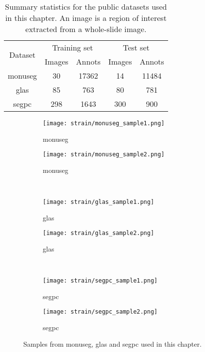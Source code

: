 \begin{table}
  \centering
  \begin{tabular}{|c|cc|cc|}
    \hline
    \multirow{2}{*}{Dataset} & \multicolumn{2}{c|}{Training set} & \multicolumn{2}{c|}{Test set}\\
    & Images & Annots    & Images & Annots  \\
    \hline
    \acrshort{monuseg} & 30 & 17362 & 14 & 11484\\
    \acrshort{glas} & 85 & 763 & 80 & 781 \\
    \acrshort{segpc} & 298 & 1643 & 300 & 900 \\
    \hline
  \end{tabular}
  \caption{Summary statistics for the public datasets used in this chapter. An image is a region of interest extracted from a whole-slide image.}
  \label{tab:strain:datasets_statistics}
\end{table}


\begin{figure}
  \centering
  \begin{subfigure}{0.48\textwidth}
    \centering
    \texttt{[image: strain/monuseg\_sample1.png]}
    \caption{\acrshort{monuseg}}
    \label{sfig:strain:monuseg_sample1}
  \end{subfigure}
  \begin{subfigure}{0.48\textwidth}
    \centering
    \texttt{[image: strain/monuseg\_sample2.png]}
    \caption{\acrshort{monuseg}}
    \label{sfig:strain:monuseg_sample2}
  \end{subfigure} \\

  \begin{subfigure}{0.48\textwidth}
    \centering
    \texttt{[image: strain/glas\_sample1.png]}
    \caption{\acrshort{glas}}
    \label{sfig:strain:glas_sample1}
  \end{subfigure}
  \begin{subfigure}{0.48\textwidth}
    \centering
    \texttt{[image: strain/glas\_sample2.png]}
    \caption{\acrshort{glas}}
    \label{sfig:strain:glas_sample2}
  \end{subfigure} \\

  \begin{subfigure}{0.48\textwidth}
    \centering
    \texttt{[image: strain/segpc\_sample1.png]}
    \caption{\acrshort{segpc}}
    \label{sfig:strain:segpc_sample1}
  \end{subfigure}
  \begin{subfigure}{0.48\textwidth}
    \centering
    \texttt{[image: strain/segpc\_sample2.png]}
    \caption{\acrshort{segpc}}
    \label{sfig:strain:segpc_sample2}
  \end{subfigure} 
  
  \caption{Samples from \acrshort{monuseg}, \acrshort{glas} and \acrshort{segpc} used in this chapter.}
  \label{fig:strain:datasets_samples}
\end{figure}

